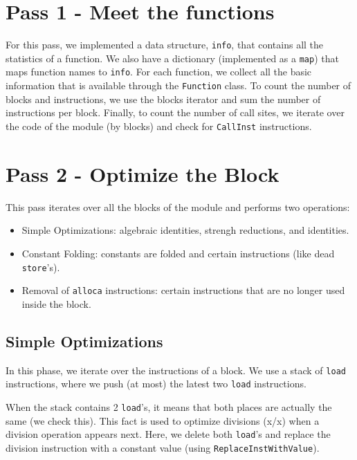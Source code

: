 \section{Pass 1 - Meet the functions}

For this pass, we implemented a data structure, \texttt{info}, that contains all the statistics of a function. We also have a dictionary (implemented as a \texttt{map})
   that maps function names to \texttt{info}. For each function, we collect all the basic information that is available through the \texttt{Function} class. To count the number
   of blocks and instructions, we use the blocks iterator and sum the number of instructions per block. Finally, to count the number of call sites, we iterate over the code of
   the module (by blocks) and check for \texttt{CallInst} instructions.

\section{Pass 2 - Optimize the Block}

This pass iterates over all the blocks of the module and performs two operations:

\begin{itemize}
   \item Simple Optimizations: algebraic identities, strengh reductions, and identities.
   \item Constant Folding: constants are folded and certain instructions (like dead \texttt{store}'s).
   \item Removal of \texttt{alloca} instructions: certain instructions that are no longer used inside the block.
\end{itemize}

\subsection{Simple Optimizations}

In this phase, we iterate over the instructions of a block. We use a stack of \texttt{load} instructions, where we push (at most) the latest two \texttt{load} instructions.

When the stack contains 2 \texttt{load}'s, it means that both places are actually the same (we check this). This fact is used to optimize divisions (x/x) when a division operation
appears next. Here, we delete both \texttt{load}'s and replace the division instruction with a constant value (using \texttt{ReplaceInstWithValue}).


